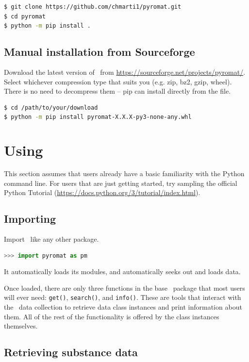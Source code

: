 \begin{lstlisting}[language=bash]
$ git clone https://github.com/chmarti1/pyromat.git
$ cd pyromat
$ python -m pip install .
\end{lstlisting}

\subsection{Manual installation from Sourceforge}

Download the latest version of \PM\ from \url{https://sourceforge.net/projects/pyromat/}.  Select whichever compression type that suits you (e.g. zip, bz2, gzip, wheel).  There is no need to decompress them -- pip can install directly from the file.

\begin{lstlisting}[language=bash]
$ cd /path/to/your/download
$ python -m pip install pyromat-X.X.X-py3-none-any.whl
\end{lstlisting}

\section{Using \PM }

This section assumes that users already have a basic familiarity with the Python command line.  For users that are just getting started, try sampling the official Python Tutorial (\url{https://docs.python.org/3/tutorial/index.html}).

\subsection{Importing}

Import \PM\ like any other package.  
\begin{lstlisting}[language=Python]
>>> import pyromat as pm
\end{lstlisting}
It automatically loads its modules, and automatically seeks out and loads data.

Once loaded, there are only three functions in the base \PM\ package that most users will ever need: \texttt{get()}, \texttt{search()}, and \texttt{info()}.  These are tools that interact with the \PM\ data collection to retrieve data class instances and print information about them.  All of the rest of the functionality is offered by the class instances themselves.

\subsection{Retrieving substance data}

